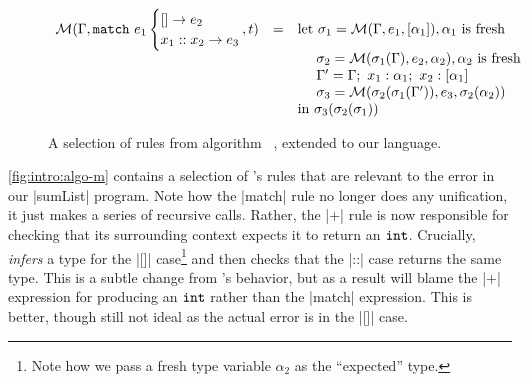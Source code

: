 \begin{figure}
\[{\begin{array}{lcl}
\M(\Gamma, \elcase{e_1}{e_2}{x_1}{x_2}{e_3}, t)
   & = & \text{let } \sigma_1 = \M(\Gamma, e_1, \tlist{\alpha_1}), \alpha_1 \text{ is fresh} \\
   &   & \quad\ \sigma_2 = \M(\sigma_1(\Gamma), e_2, \alpha_2), \alpha_2 \text{ is fresh} \\
   &   & \quad\ \Gamma' = \Gamma;\ x_1:\alpha_1;\ x_2:\tlist{\alpha_1} \\
   &   & \quad\ \sigma_3 = \M(\sigma_2(\sigma_1(\Gamma')), e_3, \sigma_2(\alpha_2)) \\
   &   & \text{in } \sigma_3(\sigma_2(\sigma_1)) \\
\end{array}
}
\]
\caption{A selection of rules from algorithm \M~\citep{Lee1998-ys},
  extended to our language.}
\label{fig:intro:algo-m}
\end{figure}

\autoref{fig:intro:algo-m} contains a selection of \M's rules that are relevant to the error in our |sumList| program.
%
Note how the |match| rule no longer does any unification, it just makes
a series of recursive calls.
%
Rather, the |+| rule is now responsible for checking that its
surrounding context expects it to return an $\mathtt{int}$.
%
Crucially, \M \emph{infers} a type for the |[]| case\footnote{Note how
  we pass a fresh type variable $\alpha_2$ as the ``expected'' type.}
and then checks that the |::| case returns the same type.
%
This is a subtle change from \W's behavior, but as a result \M will
blame the |+| expression for producing an $\mathtt{int}$ rather than the
|match| expression.
%
This is better, though still not ideal as the actual error is in the
|[]| case.

%

